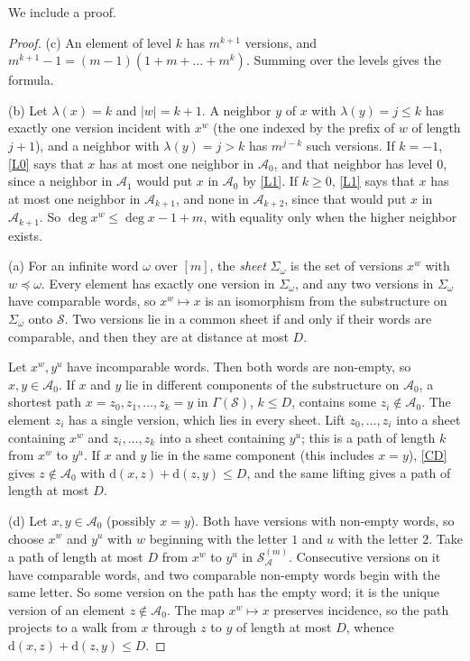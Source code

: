 \documentclass[11pt]{amsart}
\theoremstyle{definition}
\theoremstyle{remark}
\newcommand{\cS}{\mathcal{S}}
\newcommand{\cA}{\mathcal{A}}
\newcommand{\dd}{\mathrm{d}}
\newcommand{\Dbl}[2]{{#1}^{(#2)}_{\cA}}
\begin{document}
We include a proof.

\begin{proof}
(c) An element of level $k$ has $m^{k+1}$ versions, and $m^{k+1}-1=(m-1)(1+m+\dots+m^k)$. Summing over the levels gives the formula.

(b) Let $\lambda(x)=k$ and $|w|=k+1$. A neighbor $y$ of $x$ with $\lambda(y)=j\le k$ has exactly one version incident with $x^w$ (the one indexed by the prefix of $w$ of length $j+1$), and a neighbor with $\lambda(y)=j>k$ has $m^{j-k}$ such versions. If $k=-1$, \ref{L0} says that $x$ has at most one neighbor in $\cA_0$, and that neighbor has level $0$, since a neighbor in $\cA_1$ would put $x$ in $\cA_0$ by \ref{L1}. If $k\ge0$, \ref{L1} says that $x$ has at most one neighbor in $\cA_{k+1}$, and none in $\cA_{k+2}$, since that would put $x$ in $\cA_{k+1}$. So $\deg x^w\le\deg x-1+m$, with equality only when the higher neighbor exists.

(a) For an infinite word $\omega$ over $[m]$, the \emph{sheet} $\Sigma_\omega$ is the set of versions $x^w$ with $w\preceq\omega$. Every element has exactly one version in $\Sigma_\omega$, and any two versions in $\Sigma_\omega$ have comparable words, so $x^w\mapsto x$ is an isomorphism from the substructure on $\Sigma_\omega$ onto $\cS$. Two versions lie in a common sheet if and only if their words are comparable, and then they are at distance at most $D$.

Let $x^w,y^u$ have incomparable words. Then both words are non-empty, so $x,y\in\cA_0$. If $x$ and $y$ lie in different components of the substructure on $\cA_0$, a shortest path $x=z_0,z_1,\dots,z_k=y$ in $\Gamma(\cS)$, $k\le D$, contains some $z_i\notin\cA_0$. The element $z_i$ has a single version, which lies in every sheet. Lift $z_0,\dots,z_i$ into a sheet containing $x^w$ and $z_i,\dots,z_k$ into a sheet containing $y^u$; this is a path of length $k$ from $x^w$ to $y^u$. If $x$ and $y$ lie in the same component (this includes $x=y$), \ref{CD} gives $z\notin\cA_0$ with $\dd(x,z)+\dd(z,y)\le D$, and the same lifting gives a path of length at most $D$.

(d) Let $x,y\in\cA_0$ (possibly $x=y$). Both have versions with non-empty words, so choose $x^w$ and $y^u$ with $w$ beginning with the letter $1$ and $u$ with the letter $2$. Take a path of length at most $D$ from $x^w$ to $y^u$ in $\Dbl{\cS}{m}$. Consecutive versions on it have comparable words, and two comparable non-empty words begin with the same letter. So some version on the path has the empty word; it is the unique version of an element $z\notin\cA_0$. The map $x^w\mapsto x$ preserves incidence, so the path projects to a walk from $x$ through $z$ to $y$ of length at most $D$, whence $\dd(x,z)+\dd(z,y)\le D$.
\end{proof}
\end{document}
